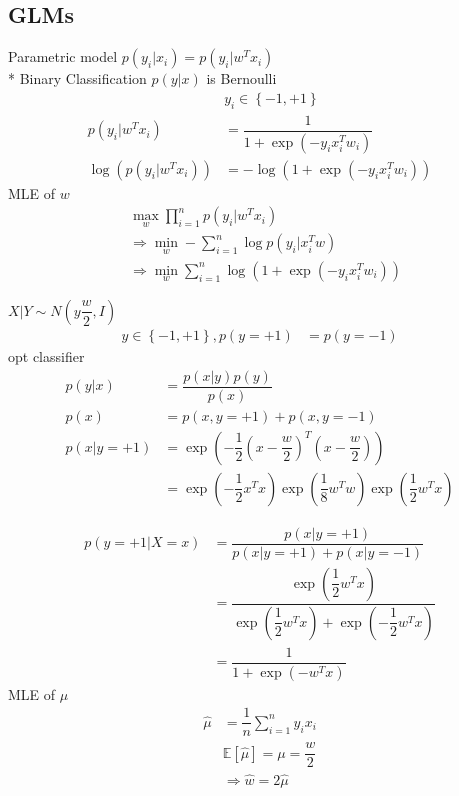 \documentclass{article}
\begin{document}
\subsection{GLMs}
Parametric model $p\left(y_{i} | x_{i}\right)  = p\left(y_{i} | w^{T} x_{i}\right)$
\\* Binary Classification $p\left(y | x \right) $ is Bernoulli
\begin{align*}
&  y_{i} \in \left\{-1, +1\right\}
\\ p\left(y_{i} | w^{T} x_{i}\right)  &= \dfrac{1}{1 + \exp\left(- y_{i} x_{i}^{T} w_{i}\right)}
\\ \log\left(p\left(y_{i} | w^{T} x_{i}\right)\right) &= - \log\left(1 + \exp\left(- y_{i} x_{i}^{T} w_{i}\right)\right)
\end{align*}
MLE of $w $
\begin{align*}
&  \displaystyle\max_{w} \displaystyle\prod_{i=1}^{n} p\left(y_{i} | w^{T} x_{i}\right)
\\ &\Rightarrow  \displaystyle\min_{w} - \displaystyle\sum_{i=1}^{n} \log p\left(y_{i} | x_{i}^{T} w \right)
\\ &\Rightarrow  \displaystyle\min_{w} \displaystyle\sum_{i=1}^{n} \log\left(1 + \exp\left(- y_{i} x_{i}^{T} w_{i}\right)\right)
\end{align*}
\begin{eg} \label{eg:nmoptcl} 
$X  | Y \sim  N\left(y \dfrac{w}{2}, I \right)$
\begin{align*}
y  \in \left\{-1, +1\right\}, p\left(y = +1\right) &= p\left(y = -1\right)
\end{align*}
opt classifier
\begin{align*}
p\left(y | x\right)  &= \dfrac{p\left(x | y\right) p\left(y\right)}{p\left(x\right)}
\\ p\left(x\right)  &= p\left(x, y = +1\right) + p\left(x, y = -1\right)
\\ p\left(x | y = +1\right)  &= \exp\left(- \dfrac{1}{2} \left(x - \dfrac{w}{2}\right)^{T} \left(x - \dfrac{w}{2}\right)\right)
\\ &= \exp\left(- \dfrac{1}{2} x^{T} x\right) \exp\left(\dfrac{1}{8} w^{T} w\right) \exp\left(\dfrac{1}{2} w^{T} x \right)
\end{align*}\end{eg}
\begin{align*}
p\left(y = +1 | X = x\right)  &= \dfrac{p\left(x | y = +1\right)}{p\left(x | y = +1\right) + p\left(x | y = -1\right)}
\\ &= \dfrac{\exp\left(\dfrac{1}{2} w^{T} x\right)}{\exp\left(\dfrac{1}{2} w^{T} x\right) + \exp\left(- \dfrac{1}{2} w^{T} x\right)}
\\ &= \dfrac{1}{1 + \exp\left(- w^{T} x\right)}
\end{align*}
MLE of $\mu$
\begin{align*}
\hat{\mu} &= \dfrac{1}{n} \displaystyle\sum_{i=1}^{n} y_{i} x_{i}
\\ &  \mathbb{E}\left[\hat{\mu}\right] = \mu = \dfrac{w}{2}
\\ &\Rightarrow  \hat{w} = 2 \hat{\mu}
\end{align*}
\end{document}
